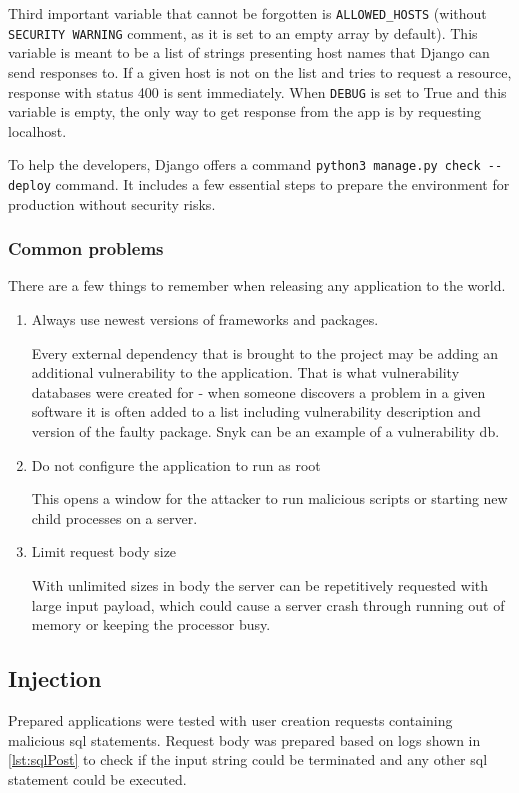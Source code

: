 Third important variable that cannot be forgotten is \lstinline{ALLOWED_HOSTS} (without \lstinline{SECURITY WARNING} comment, as it is set to an empty array by default). This variable is meant to be a list of strings presenting host names that Django can send responses to. If a given host is not on the list and tries to request a resource, response with status 400 is sent immediately. When \lstinline{DEBUG} is set to True and this variable is empty, the only way to get response from the app is by requesting localhost.

To help the developers, Django offers a command \lstinline{python3 manage.py check --deploy} command. It includes a few essential steps to prepare the environment for production without security risks.


\subsubsection{Common problems}
There are a few things to remember when releasing any application to the world.
\begin{enumerate}
    \item Always use newest versions of frameworks and packages.

          Every external dependency that is brought to the project may be adding an additional vulnerability to the application. That is what vulnerability databases were created for - when someone discovers a problem in a given software it is often added to a list including vulnerability description and version of the faulty package. Snyk can be an example of a vulnerability \acrshort{db}.

    \item Do not configure the application to run as root

          This opens a window for the attacker to run malicious scripts or starting new child processes on a server.

    \item Limit request body size

          With unlimited sizes in body the server can be repetitively requested with large input payload, which could cause a server crash through running out of memory or keeping the processor busy.
\end{enumerate}

\subsection{Injection}
Prepared applications were tested with user creation requests containing malicious \acrshort{sql} statements. Request body was prepared based on logs shown in \ref{lst:sqlPost} to check if the input string could be terminated and any other \acrshort{sql} statement could be executed.


